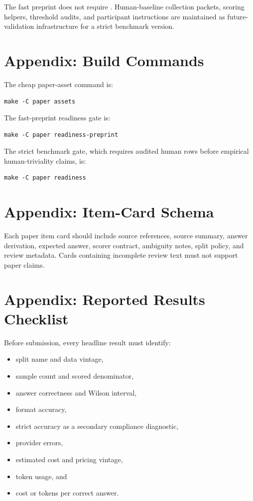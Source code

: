 The fast preprint does not require .
Human-baseline collection packets, scoring helpers, threshold audits, and
participant instructions are maintained as future-validation infrastructure
for a strict benchmark version.

\section{Appendix: Build Commands}

The cheap paper-asset command is:

\begin{verbatim}
make -C paper assets
\end{verbatim}

The fast-preprint readiness gate is:

\begin{verbatim}
make -C paper readiness-preprint
\end{verbatim}

The strict benchmark gate, which requires audited human rows before empirical
human-triviality claims, is:

\begin{verbatim}
make -C paper readiness
\end{verbatim}

\section{Appendix: Item-Card Schema}

Each paper item card should include source references, source summary, answer
derivation, expected answer, scorer contract, ambiguity notes, split policy,
and review metadata. Cards containing incomplete review text must not support
paper claims.

\section{Appendix: Reported Results Checklist}

Before submission, every headline result must identify:

\begin{itemize}
  \item split name and data vintage,
  \item sample count and scored denominator,
  \item answer correctness and Wilson interval,
  \item format accuracy,
  \item strict accuracy as a secondary compliance diagnostic,
  \item provider errors,
  \item estimated cost and pricing vintage,
  \item token usage, and
  \item cost or tokens per correct answer.
\end{itemize}
